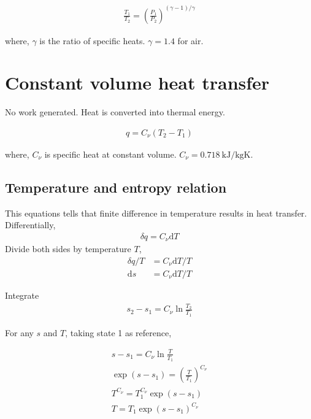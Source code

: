 \documentclass{article}
\begin{document}
		\begin{align*}
			\frac{T_1}{T_2} = \left(\frac{P_1}{P_2}\right)^{(\gamma-1)/\gamma}
		\end{align*}
	
		where, $\gamma$ is the ratio of specific heats. $\gamma=1.4$ for air.
	
		\section{Constant volume heat transfer}
		
		No work generated. Heat is converted into thermal energy.
		 
		\begin{align*}		
			q = C_\nu(T_2 - T_1)
		\end{align*}
	
		where, $C_\nu$ is specific heat at constant volume. $C_\nu = \SI{0.718}{\kilo\joule\per\kg\kelvin}$.
		
		\subsection{Temperature and entropy relation}
	
		This equations tells that finite difference in temperature results in heat transfer. Differentially,
		\begin{align*}		
			\delta q = C_\nu\text{d}T
		\end{align*}
		Divide both sides by temperature $T$,
		\begin{align*}		
			\delta q/T &= C_\nu\text{d}T/T\\
			\text{d}s &= C_\nu\text{d}T/T
		\end{align*}	
		
		Integrate
		\begin{align*}		
			s_2 - s_1 = C_\nu\ln\frac{T_2}{T_1}
		\end{align*}
		
		For any $s$ and $T$, taking state 1 as reference,
		
		\begin{align*}		
			s - s_1 = C_\nu\ln\frac{T}{T_1}\\
			\exp(s - s_1) = \left(\frac{T}{T_1}\right)^{C_\nu}\\
			T^{C_\nu} = T_1^{C_\nu}\exp(s - s_1)\\
			T = T_1\exp(s - s_1)^{C_\nu}
		\end{align*}
	
	
	
	
	
\end{document}

